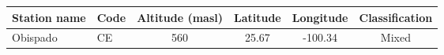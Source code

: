 \begin{table}[H]
    \begin{tabular}{llcccc} \hline
        Station name   & Code & Altitude (masl) & Latitude & Longitude & Classification \\ \hline
        Obispado       & CE   & 560             & 25.67    & -100.34   & Mixed          \\

\end{tabular}
\end{table}
